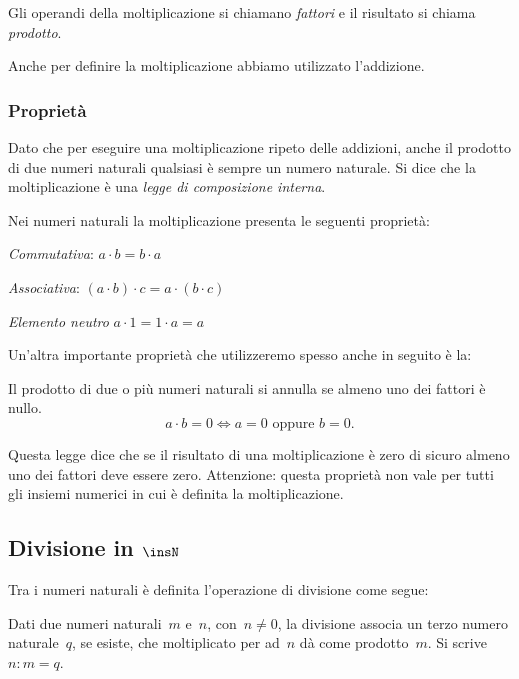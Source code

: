Gli operandi della moltiplicazione si chiamano \emph{fattori} e il risultato 
si chiama \emph{prodotto}.

\osservazione Anche per definire la moltiplicazione abbiamo utilizzato 
l'addizione.

\subsubsection{Proprietà}

Dato che per eseguire una moltiplicazione ripeto delle addizioni, 
anche il prodotto di due numeri  naturali qualsiasi è sempre un numero 
naturale. 
Si dice che la moltiplicazione è una \emph{legge di composizione interna}. 

Nei numeri naturali la moltiplicazione presenta le seguenti proprietà:

\begin{itemize*}
 \item \emph{Commutativa}: $a \cdot b = b \cdot a$
 \item \emph{Associativa}: $(a \cdot b) \cdot c = a \cdot (b \cdot c)$
 \item \emph{Elemento neutro} $a \cdot 1 = 1 \cdot a = a$
\end{itemize*}

Un'altra importante proprietà che utilizzeremo spesso anche in seguito è la:

\begin{legge}
 Il prodotto di due o più numeri naturali si annulla se almeno uno dei fattori 
 è nullo.
\[ a\cdot b=0\Leftrightarrow a=0\text{ oppure }b=0. \]
\end{legge}

Questa legge dice che se il risultato di una moltiplicazione è zero di sicuro
almeno uno dei fattori deve essere zero. Attenzione: questa proprietà non 
vale per tutti gli insiemi numerici in cui è definita la moltiplicazione.

\subsection{Divisione in $\insN$}

Tra i numeri naturali è definita l'operazione di divisione come segue:

\begin{definizione}
Dati due numeri naturali~$m$ e~$n$, con~$n \neq 0$, la divisione associa 
un terzo numero naturale~$q$, se esiste, che moltiplicato per ad~$n$ dà come 
prodotto~$m$.
Si scrive~$n : m = q$.
\end{definizione}

